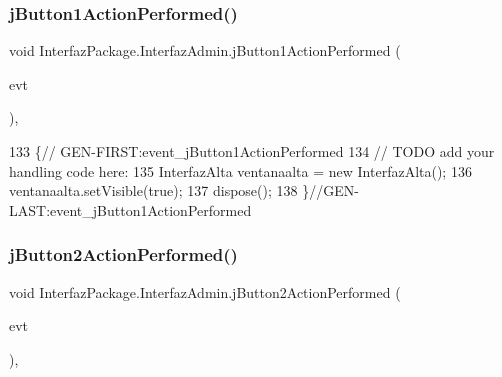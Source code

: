 \subsubsection{\texorpdfstring{j\+Button1\+Action\+Performed()}{jButton1ActionPerformed()}}
{\footnotesize\ttfamily void Interfaz\+Package.\+Interfaz\+Admin.\+j\+Button1\+Action\+Performed (\begin{DoxyParamCaption}\item[{java.\+awt.\+event.\+Action\+Event}]{evt }\end{DoxyParamCaption})\hspace{0.3cm}{\ttfamily [inline]}, {\ttfamily [private]}}


\begin{DoxyCode}
133                                                                          \{\textcolor{comment}{//
      GEN-FIRST:event\_jButton1ActionPerformed}
134         \textcolor{comment}{// TODO add your handling code here:}
135         InterfazAlta ventanaalta = \textcolor{keyword}{new} InterfazAlta();
136         ventanaalta.setVisible(\textcolor{keyword}{true});
137         dispose();
138     \}\textcolor{comment}{//GEN-LAST:event\_jButton1ActionPerformed}
\end{DoxyCode}
\mbox{\label{class_interfaz_package_1_1_interfaz_admin_a11a622906a9352165bce2b478ff0111c}} 
\subsubsection{\texorpdfstring{j\+Button2\+Action\+Performed()}{jButton2ActionPerformed()}}
{\footnotesize\ttfamily void Interfaz\+Package.\+Interfaz\+Admin.\+j\+Button2\+Action\+Performed (\begin{DoxyParamCaption}\item[{java.\+awt.\+event.\+Action\+Event}]{evt }\end{DoxyParamCaption})\hspace{0.3cm}{\ttfamily [inline]}, {\ttfamily [private]}}



